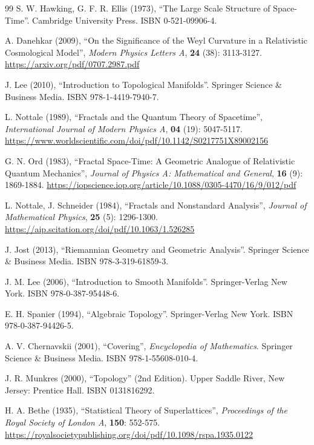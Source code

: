 \documentclass{article}
\begin{document}
\begin{thebibliography}{99}
S. W. Hawking, G. F. R. Ellis (1973), ``The Large Scale Structure of Space-Time''. Cambridge University Press. ISBN 0-521-09906-4.

A. Danehkar (2009), ``On the Significance of the Weyl Curvature in a Relativistic Cosmological Model'', 
\textit{Modern Physics Letters A}, \textbf{24} (38): 3113-3127. \url{https://arxiv.org/pdf/0707.2987.pdf}

J. Lee (2010), ``Introduction to Topological Manifolds''. Springer Science \& Business Media. ISBN 978-1-4419-7940-7.

L. Nottale (1989), ``Fractals and the Quantum Theory of Spacetime'', \textit{International Journal of Modern Physics A}, \textbf{04} (19): 5047-5117. \url{https://www.worldscientific.com/doi/pdf/10.1142/S0217751X89002156}

G. N. Ord (1983), ``Fractal Space-Time: A Geometric Analogue of Relativistic Quantum Mechanics'', \textit{Journal of Physics A: Mathematical and General}, \textbf{16} (9): 1869-1884. \url{https://iopscience.iop.org/article/10.1088/0305-4470/16/9/012/pdf}

L. Nottale, J. Schneider (1984), ``Fractals and Nonstandard Analysis'', \textit{Journal of Mathematical Physics}, \textbf{25} (5): 1296-1300. \url{https://aip.scitation.org/doi/pdf/10.1063/1.526285}

J. Jost (2013), ``Riemannian Geometry and Geometric Analysis''. Springer Science \& Business Media. ISBN 978-3-319-61859-3.

J. M. Lee (2006), ``Introduction to Smooth Manifolds''. Springer-Verlag New York. ISBN 978-0-387-95448-6.

E. H. Spanier (1994), ``Algebraic Topology''. Springer-Verlag New York. ISBN 978-0-387-94426-5.

A. V. Chernavskii (2001), ``Covering'', \textit{Encyclopedia of Mathematics}. Springer Science \& Business Media. ISBN 978-1-55608-010-4.

J. R. Munkres (2000), ``Topology'' (2nd Edition). Upper Saddle River, New Jersey: Prentice Hall. ISBN 0131816292.

H. A. Bethe (1935), ``Statistical Theory of Superlattices'', \textit{Proceedings of the Royal Society of London A}, \textbf{150}: 552-575. \url{https://royalsocietypublishing.org/doi/pdf/10.1098/rspa.1935.0122}


\end{thebibliography}
\end{document}
